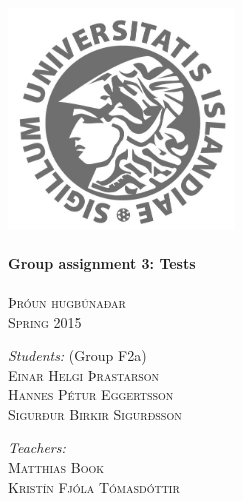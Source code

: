 \documentclass{article}
\begin{document}
\begin{titlepage}
\begin{center}
\textsc{}\\[2cm] 

\includegraphics[width=6cm]{Haskoli_Islands_rett.jpg}\\[0.5cm]

\HRule \\[0.6cm]
{ \huge \bfseries Group assignment 3: Tests}\\[0.2cm]
\HRule \\[0.4cm]

\textsc{\normalsize Þróun hugbúnaðar} \\
\textsc{Spring 2015} \\[1.5cm]

\begin{minipage}{0.45\textwidth}
\begin{flushleft} \large
\textit{Students:} (Group F2a)\\
\textsc{Einar Helgi Þrastarson} \\
\textsc{Hannes Pétur Eggertsson} \\
\textsc{Sigurður Birkir Sigurðsson} \\
\end{flushleft}
\end{minipage}
\begin{minipage}{0.45\textwidth}
\begin{flushright} \large
\textit{Teachers:} \\
\textsc{Matthias Book}\\
\textsc{Kristín Fjóla Tómasdóttir}\\
\textsc{ }\\
\end{flushright}
\end{minipage}

\end{center}
\end{titlepage}
\end{document}

